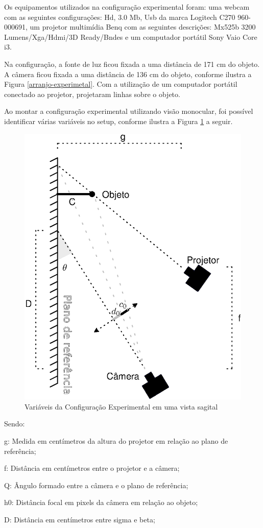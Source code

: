 \documentclass[a4paper, 12pt]{article}
\begin{document}
Os equipamentos utilizados na configuração experimental foram: uma webcam com as seguintes configurações: Hd, 3.0 Mb, Usb da marca Logitech C270 960-000691, um projetor multimídia Benq com as seguintes descrições: Mx525b 3200 Lumens/Xga/Hdmi/3D Ready/Bndes e um computador portátil Sony Vaio Core i3. 

Na configuração, a fonte de luz ficou fixada a uma distância de 171 cm do objeto. A câmera ficou fixada a uma distância de 136 cm do objeto, conforme ilustra a Figura \ref{arranjo-experimetal}.  Com a utilização de um computador portátil conectado ao projetor, projetaram linhas sobre o objeto.

Ao montar a configuração experimental utilizando visão monocular, foi possível identificar várias variáveis no setup, conforme ilustra a Figura \ref{setup com as variaveis} a seguir.

\begin{figure}[H]
	\centering
		\includegraphics[width=.55\linewidth]{vista_sagital.eps}
	\caption{Variáveis da Configuração Experimental em uma vista sagital}
	\label{setup com as variaveis}
\end{figure}

Sendo:

g: Medida em centímetros da altura do projetor em relação ao plano de referência;

f:  Distância em centímetros entre o projetor e a câmera;	          

Q: Ângulo formado entre a câmera e o plano de referência;

h0: Distância focal em pixels da câmera em relação ao objeto;  

D:  Distância em centímetros entre sigma e beta;
\end{document}
